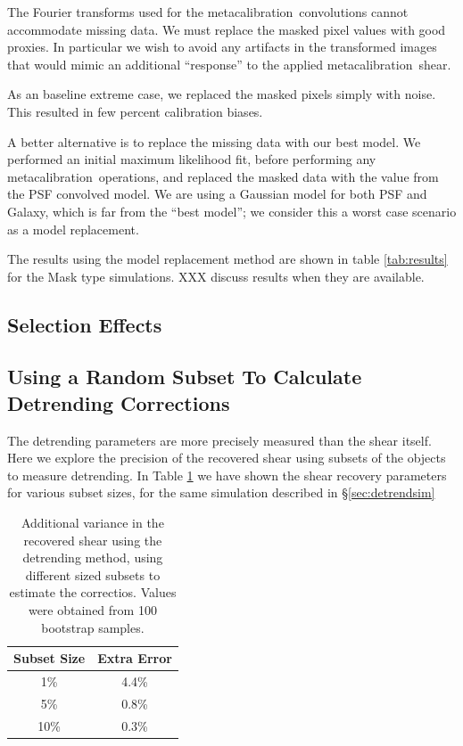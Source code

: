 \documentclass[usegraphicx,usenatbib]{mn2e}
\newcommand{\mcal}{metacalibration}
\begin{document}
The Fourier transforms used for the \mcal\ convolutions cannot accommodate
missing data.  We must replace the masked pixel values with good proxies.  In
particular we wish to avoid any artifacts in the transformed images that would
mimic an additional ``response'' to the applied \mcal\ shear.

As an baseline extreme case, we replaced the masked pixels simply with noise.
This resulted in few percent calibration biases.

A better alternative is to replace the missing data with our best model.  We
performed an initial maximum likelihood fit, before performing any \mcal\
operations, and replaced the masked data with the value from the PSF convolved
model.  We are using a Gaussian model for both PSF and Galaxy, which is far
from the ``best model''; we consider this a worst case scenario as a model
replacement. 

The results using the model replacement method are shown in table
\ref{tab:results} for the Mask type simulations.  XXX discuss results when they
are available.


\subsection{Selection Effects} \label{sec:selection}

\subsection{Using a Random Subset To Calculate Detrending Corrections}

The detrending parameters are more precisely measured than the shear itself.
Here we explore the precision of the recovered shear using subsets of the
objects to measure detrending.  In Table \ref{tab:subsets} we have shown the
shear recovery parameters for various subset sizes, for the same simulation
described in \S \ref{sec:detrendsim}

\begin{table}
    \centering
    \caption{Additional variance in the recovered shear using the
        detrending method, using different sized subsets to
        estimate the correctios.  Values were obtained
        from 100 bootstrap samples. \label{tab:subsets}}
    \begin{tabular}{| c | c |}
        Subset Size & Extra Error \\
        \hline
        1\% & 4.4\% \\
        5\% & 0.8\% \\
        10\% & 0.3\% \\
    \end{tabular}
\end{table}
\end{document}
